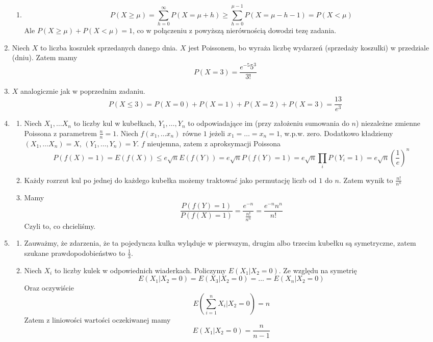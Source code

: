 \documentclass{article}
\begin{document}
\begin{enumerate}
\begin{enumerate}
			\item 
			\[
			P(X \geq \mu) = \sum_{h=0}^{\infty} P(X = \mu + h) \geq \sum_{h = 0}^{\mu-1} P(X = \mu - h - 1) = P(X < \mu)
			\]
			Ale $P(X \geq \mu) + P(X < \mu) = 1$, co w połączeniu z powyższą nierównością dowodzi tezę zadania.
		\end{enumerate}
		
		\item Niech $X$ to liczba koszulek sprzedanych danego dnia. $X$ jest Poissonem, bo wyraża liczbę wydarzeń (sprzedaży koszulki) w przedziale (dniu). Zatem mamy
		\[
		P(X = 3) = \frac{e^{-5}5^3}{3!}
		\]
		
		\item $X$ analogicznie jak w poprzednim zadaniu.
		\[
		P(X \leq 3) = P(X = 0) + P(X=1) + P(X=2) + P(X=3) = \frac{13}{e^3}
		\]
		
		\item 
		\begin{enumerate}
			\item Niech $X_1, \ldots X_n$ to liczby kul w kubełkach, $Y_1, \ldots, Y_n$ to odpowiadające im (przy założeniu sumowania do $n$) niezależne zmienne Poissona z parametrem $\frac{n}{n}=1$. Niech $f(x_1, \ldots x_n)$ równe $1$ jeżeli $x_1 = \ldots = x_n = 1$, w.p.w. zero. Dodatkowo kładziemy $(X_1, \dots X_n) = X$, $(Y_1, \dots, Y_n) = Y$. $f$ nieujemna, zatem z aproksymacji Poissona
			\[
			P(f(X) = 1) = E(f(X)) \leq e\sqrt{n}E(f(Y)) = e\sqrt{n}P(f(Y) = 1) = e\sqrt{n} \prod_i P(Y_i = 1) = e\sqrt{n} (\frac{1}{e})^n
			\]
			
			\item Każdy rozrzut kul po jednej do każdego kubełka możemy traktować jako permutację liczb od $1$ do $n$. Zatem wynik to $\frac{n!}{n^n}$
			
			\item Mamy 
			\[
			\frac{P(f(Y)=1)}{P(f(X)=1)} = \frac{e^{-n}}{\frac{n!}{n^n}} = \frac{e^{-n}n^n}{n!}
			\]
			Czyli to, co chcieliśmy.
		\end{enumerate}
		
		\item 
		\begin{enumerate}
			\item Zauważmy, że zdarzenia, że ta pojedyncza kulka wyląduje w pierwszym, drugim albo trzecim kubełku są symetryczne, zatem szukane prawdopodobieństwo to $\frac{1}{3}$.
			
			\item Niech $X_i$ to liczby kulek w odpowiednich wiaderkach. Policzymy $E(X_1 | X_2 = 0)$. Ze względu na symetrię
			\[
			E(X_1 | X_2 = 0) = E(X_3 | X_2 = 0) = \ldots = E(X_n | X_2 = 0)
			\]
			Oraz oczywiście
			\[
			E(\sum_{i=1}^{n} X_i| X_2 = 0) = n
			\]
			Zatem z liniowości wartości oczekiwanej mamy
			\[
			E(X_1 | X_2 = 0) = \frac{n}{n-1}
			\]
			

\end{enumerate}
\end{enumerate}
\end{document}
